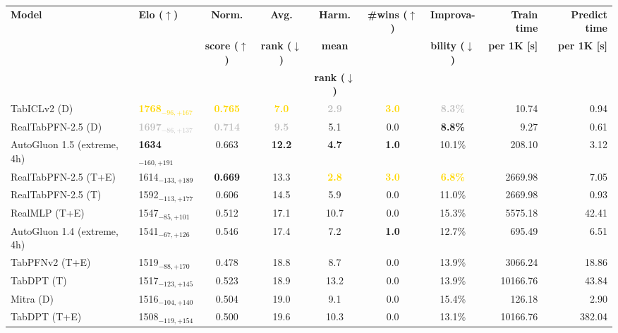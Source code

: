 \begin{tabular}{llcccccrr}
\toprule
\textbf{Model} & \textbf{Elo ($\uparrow$)} & \textbf{Norm.} & \textbf{Avg.} & \textbf{Harm.} & \textbf{\#wins ($\uparrow$)} & \textbf{Improva-} & \textbf{Train time} & \textbf{Predict time} \\
 &  & \textbf{score ($\uparrow$)} & \textbf{rank ($\downarrow$)} & \textbf{mean} &  & \textbf{bility ($\downarrow$)} & \textbf{per 1K [s]} & \textbf{per 1K [s]} \\
 &  &  &  & \textbf{rank ($\downarrow$)} &  &  &  &  \\
\midrule
TabICLv2 (D) & \textcolor{gold}{\textbf{1768${}_{-96,+167}$}} & \textcolor{gold}{\textbf{0.765}} & \textcolor{gold}{\textbf{7.0}} & \textcolor{silver}{\textbf{2.9}} & \textcolor{gold}{\textbf{3.0}} & \textcolor{silver}{\textbf{8.3\%}} & 10.74 & 0.94 \\
RealTabPFN-2.5 (D) & \textcolor{silver}{\textbf{1697${}_{-86,+137}$}} & \textcolor{silver}{\textbf{0.714}} & \textcolor{silver}{\textbf{9.5}} & 5.1 & 0.0 & \textcolor{bronze}{\textbf{8.8\%}} & 9.27 & 0.61 \\
AutoGluon 1.5 (extreme, 4h) & \textcolor{bronze}{\textbf{1634${}_{-160,+191}$}} & 0.663 & \textcolor{bronze}{\textbf{12.2}} & \textcolor{bronze}{\textbf{4.7}} & \textcolor{bronze}{\textbf{1.0}} & 10.1\% & 208.10 & 3.12 \\
RealTabPFN-2.5 (T+E) & 1614${}_{-133,+189}$ & \textcolor{bronze}{\textbf{0.669}} & 13.3 & \textcolor{gold}{\textbf{2.8}} & \textcolor{gold}{\textbf{3.0}} & \textcolor{gold}{\textbf{6.8\%}} & 2669.98 & 7.05 \\
RealTabPFN-2.5 (T) & 1592${}_{-113,+177}$ & 0.606 & 14.5 & 5.9 & 0.0 & 11.0\% & 2669.98 & 0.93 \\
RealMLP (T+E) & 1547${}_{-85,+101}$ & 0.512 & 17.1 & 10.7 & 0.0 & 15.3\% & 5575.18 & 42.41 \\
AutoGluon 1.4 (extreme, 4h) & 1541${}_{-67,+126}$ & 0.546 & 17.4 & 7.2 & \textcolor{bronze}{\textbf{1.0}} & 12.7\% & 695.49 & 6.51 \\
TabPFNv2 (T+E) & 1519${}_{-88,+170}$ & 0.478 & 18.8 & 8.7 & 0.0 & 13.9\% & 3066.24 & 18.86 \\
TabDPT (T) & 1517${}_{-123,+145}$ & 0.523 & 18.9 & 13.2 & 0.0 & 13.9\% & 10166.76 & 43.84 \\
Mitra (D) & 1516${}_{-104,+140}$ & 0.504 & 19.0 & 9.1 & 0.0 & 15.4\% & 126.18 & 2.90 \\
TabDPT (T+E) & 1508${}_{-119,+154}$ & 0.500 & 19.6 & 10.3 & 0.0 & 13.1\% & 10166.76 & 382.04 \\

\end{tabular}
